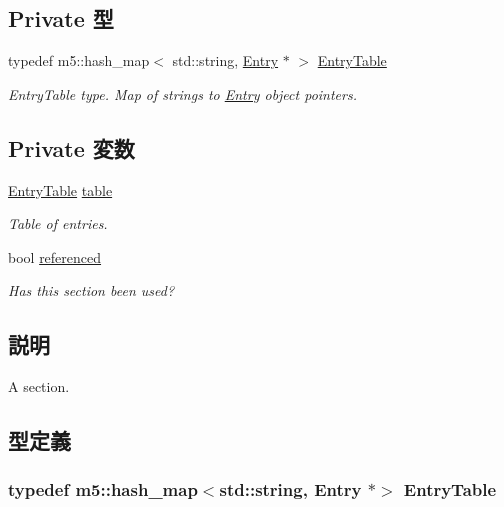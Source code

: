 \subsection*{Private 型}
\begin{DoxyCompactItemize}
\item 
typedef m5::hash\_\-map$<$ std::string, \hyperlink{classIniFile_1_1Entry}{Entry} $\ast$ $>$ \hyperlink{classIniFile_1_1Section_ad995a87b3c533e5d50b43cac19dbb9e1}{EntryTable}
\begin{DoxyCompactList}\small\item\em EntryTable type. Map of strings to \hyperlink{classIniFile_1_1Entry}{Entry} object pointers. \item\end{DoxyCompactList}\end{DoxyCompactItemize}
\subsection*{Private 変数}
\begin{DoxyCompactItemize}
\item 
\hyperlink{classIniFile_1_1Section_ad995a87b3c533e5d50b43cac19dbb9e1}{EntryTable} \hyperlink{classIniFile_1_1Section_a064a83514d9112677d600fdf61cb9ad0}{table}
\begin{DoxyCompactList}\small\item\em Table of entries. \item\end{DoxyCompactList}\item 
bool \hyperlink{classIniFile_1_1Section_a591be5ec02bb1171f1edde9acdbcfc50}{referenced}
\begin{DoxyCompactList}\small\item\em Has this section been used? \item\end{DoxyCompactList}\end{DoxyCompactItemize}


\subsection{説明}
A section. 

\subsection{型定義}
\hypertarget{classIniFile_1_1Section_ad995a87b3c533e5d50b43cac19dbb9e1}{
\subsubsection[{EntryTable}]{\setlength{\rightskip}{0pt plus 5cm}typedef m5::hash\_\-map$<$std::string, {\bf Entry} $\ast$$>$ {\bf EntryTable}}}
\label{classIniFile_1_1Section_ad995a87b3c533e5d50b43cac19dbb9e1}


